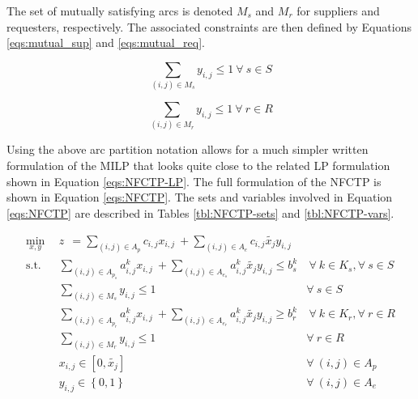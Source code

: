The set of mutually satisfying arcs is denoted $M_s$ and $M_r$ for suppliers and
requesters, respectively. The associated constraints are then defined by
Equations \ref{eqs:mutual_sup} and \ref{eqs:mutual_req}.

\begin{equation}\label{eqs:mutual_sup}
  \sum_{(i, j) \in M_{s}} y_{i,j} \leq 1 \: \forall \: s \in S 
\end{equation}

\begin{equation}\label{eqs:mutual_req}
  \sum_{(i, j) \in M_{r}} y_{i,j} \leq 1 \: \forall \: r \in R 
\end{equation}


Using the above arc partition notation allows for a much simpler written
formulation of the MILP that looks quite close to the related LP formulation
shown in Equation \ref{eqs:NFCTP-LP}. The full formulation of the NFCTP is shown
in Equation \ref{eqs:NFCTP}.  The sets and variables involved in Equation
\ref{eqs:NFCTP} are described in Tables \ref{tbl:NFCTP-sets} and
\ref{tbl:NFCTP-vars}.


\begin{subequations}\label{eqs:NFCTP}
  \begin{align}
    \min_{x, y} \:\: 
    & 
    z \:\: = 
    \sum_{(i, j) \in A_p} c_{i,j} x_{i,j} 
    \: + 
    \sum_{(i, j) \in A_e} c_{i,j} \tilde{x_j} y_{i,j} 
    & 
    \label{eqs:NFCTP_obj} \\
    \text{s.t.} \:\: 
    &
    \sum_{(i, j) \in A_{p_s}} a^k_{i,j} x_{i,j}
    \: + 
    \sum_{(i, j) \in A_{e_s}} a^k_{i,j} \tilde{x_j} y_{i,j}
    \leq b^k_s 
    &
    \: 
    \forall \: k \in K_s, 
    \forall \: s \in S 
    \label{eqs:NFCTP_sup} \\
    &
    \sum_{(i, j) \in M_{s}} y_{i,j} \leq 1 
    &
    \forall \: s \in S 
    \label{eqs:NFCTP_mut_sup} \\
    &
    \sum_{(i, j) \in A_{p_r}} a^k_{i,j} x_{i,j}
    \: + 
    \sum_{(i, j) \in A_{e_r}} a^k_{i,j} \tilde{x_j} y_{i,j}
    \geq b^k_r 
    &
    \: 
    \forall \: k \in K_r,  
    \forall \: r \in R 
    \label{eqs:NFCTP_req} \\
    &
    \sum_{(i, j) \in M_{r}} y_{i,j} \leq 1 
    &
    \forall \: r \in R 
    \label{eqs:NFCTP_mut_req} \\
    &
    x_{i,j} \in [0, \tilde{x_j}]
    &
    \forall \: (i, j) \in A_p
    \label{eqs:NFCTP_x} \\
    &
    y_{i,j} \in \left\{ 0, 1 \right\}
    &
    \forall \: (i, j) \in A_e
    \label{eqs:NFCTP_y}
  \end{align}
\end{subequations}

